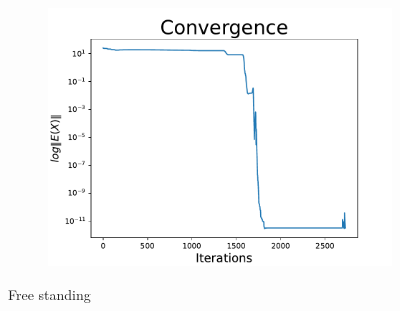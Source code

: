 \begin{figure}[!ht]
\begin{subfigure}{.72\textwidth}
\end{subfigure}%
\begin{subfigure}{.3\textwidth}
  \centering
  \includegraphics[width=0.99\linewidth]{Bilder/FREESTANDINGconv.pdf}
  \label{fig:sub2}
\end{subfigure}
\caption{Free standing}
\label{P69}
\end{figure}


